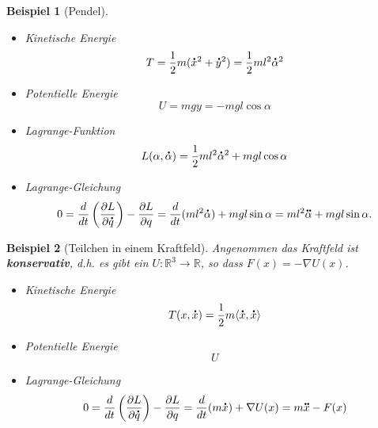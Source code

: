 \documentclass[german]{scrreprt}
\let\emph\textbf
\newcommand{\R}{\mathbb R}
\theoremstyle{plain}
\theoremstyle{nonumberplain}
\theoremstyle{nonumberplain}
\newtheorem{bsp}{Beispiel}
\theoremstyle{nonumberplain}
\renewcommand*{\dot}[1]{\accentset{\mbox{\large\bfseries .}}{#1}}
\renewcommand*{\ddot}[1]{\accentset{\mbox{\large\bfseries .\hspace{-0.25ex}.}}{#1}}
\begin{document}
\begin{bsp}[Pendel]
	\begin{itemize}
		\item Kinetische Energie
		\begin{equation*}
		T = \frac12 m (\dot x^2 + \dot y^2) = \frac12 m l^2 \dot\alpha^2
		\end{equation*}
		\item Potentielle Energie
		\begin{equation*}
		U = mgy = -mgl \cos \alpha
		\end{equation*}
		\item Lagrange-Funktion
		\begin{equation*}
		L(\alpha, \dot\alpha) = \frac12 m l^2 \dot\alpha^2 + mgl \cos \alpha
		\end{equation*}
		\item Lagrange-Gleichung
		\begin{equation*}
		0
		= \frac{d}{dt} \left( \frac{\partial L}{\partial \dot q} \right) - \frac{\partial L}{\partial q}
		= \frac{d}{dt}( ml^2\dot\alpha ) + mgl \sin \alpha
		= ml^2\ddot\alpha + mgl \sin \alpha.
		\end{equation*}
	\end{itemize}
\end{bsp}

\begin{bsp}[Teilchen in einem Kraftfeld]
	Angenommen das Kraftfeld ist \emph{konservativ}, d.h. es gibt ein $U: \R^3 \to \R$, so dass $F(x) = -\nabla U(x)$.
	\begin{itemize}
		\item Kinetische Energie
		\begin{equation*}
			T(x, \dot x) = \frac12 m \langle \dot x, \dot x \rangle
		\end{equation*}
		\item Potentielle Energie
		\begin{equation*}
			U
		\end{equation*}
		\item Lagrange-Gleichung
		\begin{equation*}
			0
			= \frac{d}{dt} \left( \frac{\partial L}{\partial \dot q} \right) - \frac{\partial L}{\partial q}
			= \frac{d}{dt}(m\dot x) + \nabla U(x) = m\ddot x - F(x)
		\end{equation*}
	\end{itemize}
\end{bsp}
\end{document}
